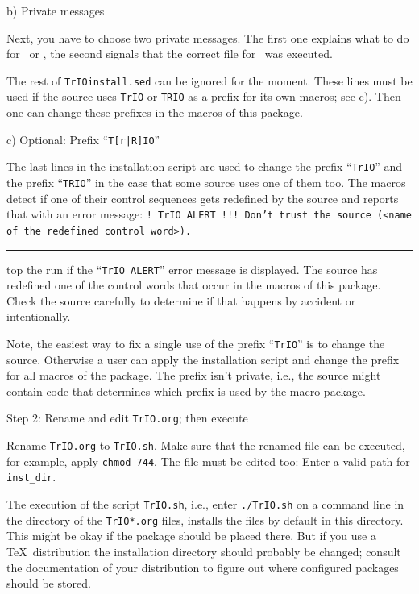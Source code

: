\beginsection \rm b) Private messages

Next, you have to choose two private messages. The first one explains
what to do for \cs\openin\ or \cs\openout, the second signals that the
correct file for \cs\ was executed.

\medskip
The rest of {\tt TrIOinstall.sed} can be ignored for the moment. These
lines must be used if the source uses {\tt TrIO} or {\tt TRIO} as a
prefix for its own macros; see c). Then one can change these prefixes
in the macros of this package.

\beginsection \rm c) Optional: Prefix ``{\tt T[r|R]IO}''

The last lines in the installation script are used to change the
prefix ``{\tt TrIO}'' and the prefix ``{\tt TRIO}'' in the case that
some source uses one of them too. The macros detect if one of their
control sequences gets redefined by the source and reports that with
an error message: {\tt !\ TrIO ALERT !!!\ Don't trust the source
(<name of the redefined control word>).}

 \rule5 Stop the run if the ``{\tt TrIO ALERT}'' error message is
displayed. The source has redefined one of the control words that
occur in the macros of this package. Check the source carefully to
determine if that happens by accident or intentionally.
\smallskip

Note, the easiest way to fix a single use of the prefix ``{\tt TrIO}''
is to change the source. Otherwise a user can apply the installation
script and change the prefix for all macros of the package. The prefix
isn't private, i.e., the source might contain code that determines
which prefix is used by the macro package.


\beginsection Step 2: \rm Rename and edit {\tt TrIO.org}; then execute

Rename {\tt TrIO.org} to {\tt TrIO.sh}. Make sure that the renamed
file can be executed, for example, apply {\tt chmod 744}. The file
must be edited too: Enter a valid path for {\tt inst\_dir}.

The execution of the script {\tt TrIO.sh}, i.e., enter {\tt ./TrIO.sh}
on a command line in the directory of the {\tt TrIO*.org} files,
installs the files by default in this directory. This might be okay if
the package should be placed there. But if you use a \TeX\
distribution the installation directory should probably be changed;
consult the documentation of your distribution to figure out where
configured packages should be stored.

